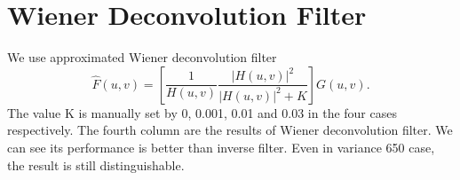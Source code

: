 \documentclass{article}
\begin{document}
\section{Wiener Deconvolution Filter}
We use approximated Wiener deconvolution filter $$\hat{F}(u,v)=[\frac{1}{H(u,v)}\frac{|H(u,v)|^2}{|H(u,v)|^2+K}]G(u,v).$$ The value K is manually set by 0, 0.001, 0.01 and 0.03 in the four cases respectively. The fourth column are the results of Wiener deconvolution filter. We can see its performance is better than inverse filter. Even in variance 650 case, the result is still distinguishable. 
\end{document}
